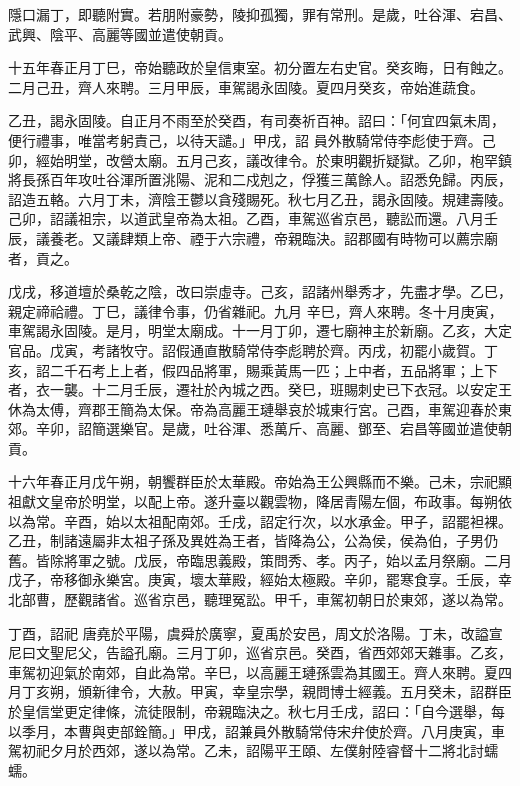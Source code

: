 \begin{pinyinscope}
 隱口漏丁，即聽附實。若朋附豪勢，陵抑孤獨，罪有常刑。是歲，吐谷渾、宕昌、武興、陰平、高麗等國並遣使朝貢。



 十五年春正月丁巳，帝始聽政於皇信東室。初分置左右史官。癸亥晦，日有蝕之。二月己丑，齊人來聘。三月甲辰，車駕謁永固陵。夏四月癸亥，帝始進蔬食。



 乙丑，謁永固陵。自正月不雨至於癸酉，有司奏祈百神。詔曰：「何宜四氣未周，便行禮事，唯當考躬責己，以待天譴。」甲戌，詔
 員外散騎常侍李彪使于齊。己卯，經始明堂，改營太廟。五月己亥，議改律令。於東明觀折疑獄。乙卯，枹罕鎮將長孫百年攻吐谷渾所置洮陽、泥和二戍剋之，俘獲三萬餘人。詔悉免歸。丙辰，詔造五輅。六月丁未，濟陰王鬱以貪殘賜死。秋七月乙丑，謁永固陵。規建壽陵。己卯，詔議祖宗，以道武皇帝為太祖。乙酉，車駕巡省京邑，聽訟而還。八月壬辰，議養老。又議肆類上帝、禋于六宗禮，帝親臨決。詔郡國有時物可以薦宗廟者，貢之。



 戊戌，移道壇於桑乾之陰，改曰崇虛寺。己亥，詔諸州舉秀才，先盡才學。乙巳，親定禘祫禮。丁巳，議律令事，仍省雜祀。九月
 辛巳，齊人來聘。冬十月庚寅，車駕謁永固陵。是月，明堂太廟成。十一月丁卯，遷七廟神主於新廟。乙亥，大定官品。戊寅，考諸牧守。詔假通直散騎常侍李彪聘於齊。丙戌，初罷小歲賀。丁亥，詔二千石考上上者，假四品將軍，賜乘黃馬一匹；上中者，五品將軍；上下者，衣一襲。十二月壬辰，遷社於內城之西。癸巳，班賜刺史已下衣冠。以安定王休為太傅，齊郡王簡為太保。帝為高麗王璉舉哀於城東行宮。己酉，車駕迎春於東郊。辛卯，詔簡選樂官。是歲，吐谷渾、悉萬斤、高麗、鄧至、宕昌等國並遣使朝貢。



 十六年春正月戊午朔，朝饗群臣於太華殿。帝始為王公興縣而不樂。己未，宗祀顯祖獻文皇帝於明堂，以配上帝。遂升臺以觀雲物，降居青陽左個，布政事。每朔依以為常。辛酉，始以太祖配南郊。壬戌，詔定行次，以水承金。甲子，詔罷袒裸。乙丑，制諸遠屬非太祖子孫及異姓為王者，皆降為公，公為侯，侯為伯，子男仍舊。皆除將軍之號。戊辰，帝臨思義殿，策問秀、孝。丙子，始以孟月祭廟。二月戊子，帝移御永樂宮。庚寅，壞太華殿，經始太極殿。辛卯，罷寒食享。壬辰，幸北部曹，歷觀諸省。巡省京邑，聽理冤訟。甲千，車駕初朝日於東郊，遂以為常。



 丁酉，詔祀
 唐堯於平陽，虞舜於廣寧，夏禹於安邑，周文於洛陽。丁未，改謚宣尼曰文聖尼父，告謚孔廟。三月丁卯，巡省京邑。癸酉，省西郊郊天雜事。乙亥，車駕初迎氣於南郊，自此為常。辛巳，以高麗王璉孫雲為其國王。齊人來聘。夏四月丁亥朔，頒新律令，大赦。甲寅，幸皇宗學，親問博士經義。五月癸未，詔群臣於皇信堂更定律條，流徒限制，帝親臨決之。秋七月壬戌，詔曰：「自今選舉，每以季月，本曹與吏部銓簡。」甲戌，詔兼員外散騎常侍宋弁使於齊。八月庚寅，車駕初祀夕月於西郊，遂以為常。乙未，詔陽平王頤、左僕射陸睿督十二將北討蠕蠕。




\end{pinyinscope}
